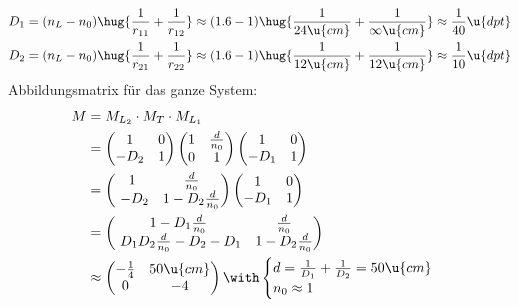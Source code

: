 \documentclass[ex]{exercise}
\begin{document}
\dottedline

\begin{align*}
    D_1 &= (n_L-n_0)\hug{\frac1{r_{11}} + \frac{1}{r_{12}}}
    \approx (1.6-1)\hug{\frac1{24\u{cm}} + \frac{1}{\infty \u{cm}}}
    \approx \frac1{40} \u{dpt}\\
    D_2 &= (n_L-n_0)\hug{\frac1{r_{21}} + \frac{1}{r_{22}}}
    \approx (1.6-1)\hug{\frac1{12\u{cm}} + \frac{1}{12 \u{cm}}}
    \approx \frac1{10} \u{dpt}
\end{align*}
Abbildungsmatrix für das ganze System:
\begin{align*}
    M &= M_{L_2}\cdot M_{T}\cdot M_{L_1}\\
    &=
    \begin{pmatrix}
        1&0\\
        -D_2&1\\
    \end{pmatrix}
    \begin{pmatrix}
        1&\frac{d}{n_0}\\
        0&1\\
    \end{pmatrix}
    \begin{pmatrix}
        1&0\\
        -D_1&1\\
    \end{pmatrix}\\
    &= \begin{pmatrix}
        1 & \frac{d}{n_0}\\\
        -D_2 & 1 - D_2 \frac{d}{n_0}\\
    \end{pmatrix}
    \begin{pmatrix}
        1&0\\
        -D_1&1\\
    \end{pmatrix}\\
    &= \begin{pmatrix}
        1 - D_1 \frac{d}{n_0}& \frac{d}{n_0}\\\
        D_1 D_2 \frac{d}{n_0} - D_2 - D_1& 1 - D_2 \frac{d}{n_0}\\
    \end{pmatrix}\\
    &\approx \begin{pmatrix}
        -\frac14& 50\u{cm}\\
        0 & -4\\
    \end{pmatrix}\with 
    \begin{cases}
        d = \frac1{D_1}+\frac1{D_2}=50\u{cm}\\
        n_0 \approx 1
    \end{cases}
\end{align*}
\end{document}
